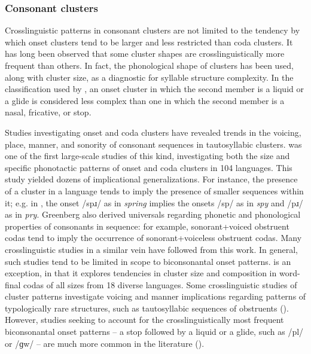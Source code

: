\subsubsection{{Consonant} {clusters}}\label{sec:1.1.2.3}

  Crosslinguistic patterns in consonant clusters are not limited to the tendency by which onset clusters tend to be larger and less restricted than coda clusters. It has long been observed that some cluster shapes are crosslinguistically more frequent than others. In fact, the phonological shape of clusters has been used, along with cluster size, as a diagnostic for syllable structure complexity. In the classification used by \citet{Maddieson2013a}, an onset cluster in which the second member is a liquid or a glide is considered less complex than one in which the second member is a nasal, fricative, or stop.

  Studies investigating onset and coda clusters have revealed trends in the voicing, place, manner, and sonority of consonant sequences in tautosyllabic clusters. \citet{Greenberg19651978} was one of the first large-scale studies of this kind, investigating both the size and specific phonotactic patterns of onset and coda clusters in 104 languages. This study yielded dozens of implicational generalizations. For instance, the presence of a cluster in a language tends to imply the presence of smaller sequences within it; e.g. in , the onset /spɹ/ as in \textit{spring} implies the onsets /sp/ as in \textit{spy} and /pɹ/ as in \textit{pry}. Greenberg also derived universals regarding phonetic and phonological properties of consonants in sequence: for example, sonorant+voiced obstruent codas tend to imply the occurrence of sonorant+voiceless obstruent codas. Many crosslinguistic studies in a similar vein have followed from this work. In general, such studies tend to be limited in scope to biconsonantal onset patterns. \citet{VanDam2004} is an exception, in that it explores tendencies in cluster size and composition in word-final codas of all sizes from 18 diverse languages. Some crosslinguistic studies of cluster patterns investigate voicing and manner implications regarding patterns of typologically rare structures, such as tautosyllabic sequences of obstruents (\citealt{Morelli1999,Morelli2003,Kreitman2008}). However, studies seeking to account for the crosslinguistically most frequent biconsonantal onset patterns -- a stop followed by a liquid or a glide, such as /pl/ or /ɡw/ -- are much more common in the literature (\citealt{Clements1990,BerentEtAl2008,BerentEtAl2011,Parker2012,Vennemann2012}). 


